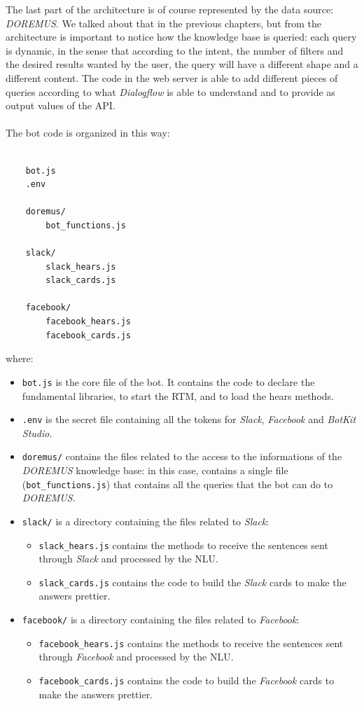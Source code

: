 \documentclass[a4paper,12pt]{report}
\begin{document}
	The last part of the architecture is of course represented by the data source: \textit{DOREMUS}. We talked about that in the previous chapters, but from the architecture is important to notice how the knowledge base is queried: each query is dynamic, in the sense that according to the intent, the number of filters and the desired results wanted by the user, the query will have a different shape and a different content. The code in the web server is able to add different pieces of queries according to what \textit{Dialogflow} is able to understand and to provide as output values of the API.\\\\
	The bot code is organized in this way:
	\begin{lstlisting}
	
	bot.js
	.env
	
	doremus/
		bot_functions.js
	
	slack/
		slack_hears.js
		slack_cards.js
	
	facebook/
		facebook_hears.js
		facebook_cards.js
	\end{lstlisting}
	where:
	\begin{itemize}
		\item \texttt{bot.js} is the core file of the bot. It contains the code to declare the fundamental libraries, to start the RTM, and to load the hears methods.
		
		\item \texttt{.env} is the secret file containing all the tokens for \textit{Slack}, \textit{Facebook} and \textit{BotKit Studio}.
		
		\item \texttt{doremus/} contains the files related to the access to the informations of the \textit{DOREMUS} knowledge base: in this case, contains a single file (\texttt{bot\_functions.js}) that contains all the queries that the bot can do to \textit{DOREMUS}.
		
		\item \texttt{slack/} is a directory containing the files related to \textit{Slack}:
			\begin{itemize}
			\item \texttt{slack\_hears.js} contains the methods to receive the sentences sent through \textit{Slack} and processed by the NLU.
			
			\item \texttt{slack\_cards.js} contains the code to build the \textit{Slack} cards to make the answers prettier.
			\end{itemize}
		\item \texttt{facebook/} is a directory containing the files related to \textit{Facebook}:
			\begin{itemize}
			\item \texttt{facebook\_hears.js} contains the methods to receive the sentences sent through \textit{Facebook} and processed by the NLU.
			
			\item \texttt{facebook\_cards.js} contains the code to build the \textit{Facebook} cards to make the answers prettier.
			\end{itemize}
	\end{itemize}
	
\end{document}
